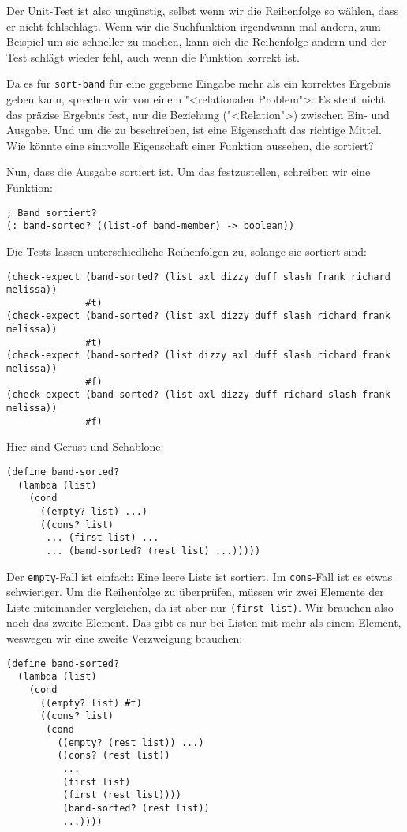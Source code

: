 Der Unit-Test ist also ungünstig, selbst wenn wir die Reihenfolge so
wählen, dass er nicht fehlschlägt.  Wenn wir die Suchfunktion
irgendwann mal ändern, zum Beispiel um sie schneller zu machen, kann
sich die Reihenfolge ändern und der Test schlägt wieder fehl, auch
wenn die Funktion korrekt ist.

Da es für \lstinline{sort-band} für eine gegebene Eingabe mehr als ein
korrektes Ergebnis geben kann, sprechen wir von einem "<relationalen
Problem">: Es steht nicht das präzise
Ergebnis fest, nur die Beziehung ("<Relation">) zwischen Ein- und
Ausgabe.  Und um die zu beschreiben, ist eine Eigenschaft das richtige
Mittel.  Wie könnte eine sinnvolle Eigenschaft einer Funktion
aussehen, die sortiert?

Nun, dass die Ausgabe sortiert ist.  Um das festzustellen, schreiben
wir eine Funktion:
%
\begin{lstlisting}
; Band sortiert?
(: band-sorted? ((list-of band-member) -> boolean))
\end{lstlisting}
%
Die Tests lassen unterschiedliche Reihenfolgen zu, solange sie
sortiert sind:
%
\begin{lstlisting}
(check-expect (band-sorted? (list axl dizzy duff slash frank richard melissa))
              #t)
(check-expect (band-sorted? (list axl dizzy duff slash richard frank melissa))
              #t)
(check-expect (band-sorted? (list dizzy axl duff slash richard frank melissa))
              #f)
(check-expect (band-sorted? (list axl dizzy duff richard slash frank melissa))
              #f)
\end{lstlisting}
%
Hier sind Gerüst und Schablone:
%
\begin{lstlisting}
(define band-sorted?
  (lambda (list)
    (cond
      ((empty? list) ...)
      ((cons? list)
       ... (first list) ...
       ... (band-sorted? (rest list) ...)))))
\end{lstlisting}
%
Der \lstinline{empty}-Fall ist einfach: Eine leere Liste ist sortiert.
Im \lstinline{cons}-Fall ist es etwas schwieriger.  Um die Reihenfolge
zu überprüfen, müssen wir zwei Elemente der Liste miteinander
vergleichen, da ist aber nur \lstinline{(first list)}.  Wir brauchen
also noch das zweite Element.  Das gibt es nur bei Listen mit mehr als
einem Element, weswegen wir eine zweite Verzweigung brauchen:
%
\begin{lstlisting}
(define band-sorted?
  (lambda (list)
    (cond
      ((empty? list) #t)
      ((cons? list)
       (cond
         ((empty? (rest list)) ...)
         ((cons? (rest list))
          ...
          (first list)
          (first (rest list))))
          (band-sorted? (rest list))
          ...))))
\end{lstlisting}
